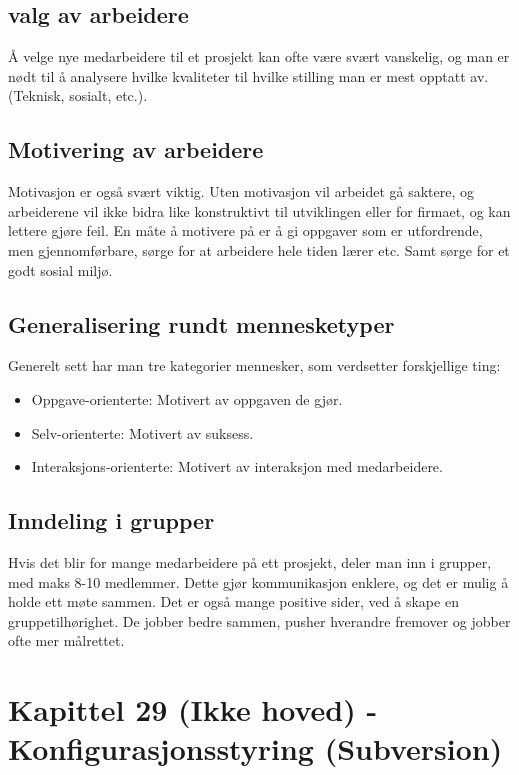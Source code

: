 \documentclass[11pt]{article}
\begin{document}
\subsection{valg av arbeidere}
\label{sec-16.1}

  Å velge nye medarbeidere til et prosjekt kan ofte være svært vanskelig, 
  og man er nødt til å analysere hvilke kvaliteter til hvilke stilling man 
  er mest opptatt av. (Teknisk, sosialt, etc.).
\subsection{Motivering av arbeidere}
\label{sec-16.2}

   Motivasjon er også svært viktig. Uten motivasjon vil arbeidet gå saktere, 
   og arbeiderene vil ikke bidra like konstruktivt til utviklingen eller for 
   firmaet, og kan lettere gjøre feil. En måte å motivere på er å gi oppgaver 
   som er utfordrende, men gjennomførbare, sørge for at arbeidere hele tiden 
   lærer etc. Samt sørge for et godt sosial miljø.
\subsection{Generalisering rundt mennesketyper}
\label{sec-16.3}

   Generelt sett har man tre kategorier mennesker, som verdsetter forskjellige ting:

\begin{itemize}
\item Oppgave-orienterte: 
     Motivert av oppgaven de gjør.
\item Selv-orienterte: 
     Motivert av suksess.
\item Interaksjons-orienterte: 
     Motivert av interaksjon med medarbeidere.
\end{itemize}
\subsection{Inndeling i grupper}
\label{sec-16.4}

   Hvis det blir for mange medarbeidere på ett prosjekt, deler man inn i grupper, 
   med maks 8-10 medlemmer. Dette gjør kommunikasjon enklere, og det er mulig å 
   holde ett møte sammen. Det er også mange positive sider, ved å skape en gruppetilhørighet. 
   De jobber bedre sammen, pusher hverandre fremover og jobber ofte mer målrettet.
\section{Kapittel 29 (Ikke hoved) - Konfigurasjonsstyring (Subversion)}
\label{sec-17}
\end{document}
